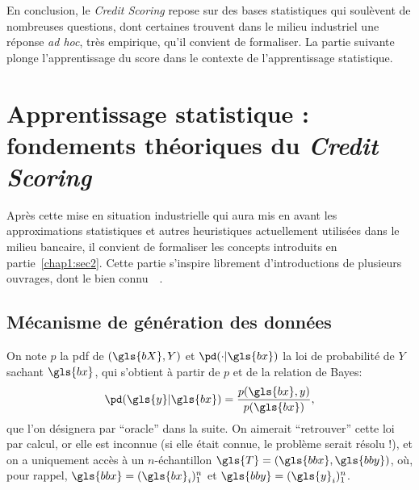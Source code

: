 \medskip

En conclusion, le \textit{Credit Scoring} repose sur des bases statistiques qui soulèvent de nombreuses questions, dont certaines trouvent dans le milieu industriel une réponse \textit{ad hoc}, très empirique, qu'il convient de formaliser. La partie suivante plonge l'apprentissage du \gls{score} dans le contexte de l'apprentissage statistique.

\section{Apprentissage statistique : fondements théoriques du \textit{Credit Scoring}} \label{chap1:sec3}

Après cette mise en situation industrielle qui aura mis en avant les approximations statistiques et autres heuristiques actuellement utilisées dans le milieu bancaire, il convient de formaliser les concepts introduits en partie~\ref{chap1:sec2}. Cette partie s'inspire librement d'introductions de plusieurs ouvrages, dont le bien connu~~\cite{friedman2001elements}.

\subsection{Mécanisme de génération des données}

On note $p$ la \gls{pdf} de $(\gls{bX},Y)$ et $\pd(\cdot | \gls{bx})$ la loi de probabilité de $Y$ sachant $\gls{bx}$, qui s'obtient à partir de $p$ et de la relation de Bayes: $$\pd(\gls{y} | \gls{bx}) = \frac{p(\gls{bx},y)}{p(\gls{bx})},$$ que l'on désignera par ``oracle'' dans la suite. On aimerait ``retrouver'' cette loi par calcul, or elle est inconnue (si elle était connue, le problème serait résolu !), et on a uniquement accès à un $n$-échantillon $\gls{T} = (\gls{bbx},\gls{bby})$, où, pour rappel, $\gls{bbx} = (\gls{bx}_i)_1^n$ et $\gls{bby} = (\gls{y}_i)_1^n$.

